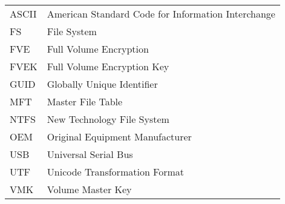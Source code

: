 
\seznamzkr

\begin{tabular}{ll}
  ASCII & American Standard Code for Information Interchange \\
  FS &  File System \\
  FVE & Full Volume Encryption \\
  FVEK & Full Volume Encryption Key \\
  GUID & Globally Unique Identifier \\
  MFT & Master File Table \\
  NTFS & New Technology File System \\
  OEM & Original Equipment Manufacturer \\
  USB & Universal Serial Bus \\
  UTF & Unicode Transformation Format \\
  VMK & Volume Master Key \\
\end{tabular}

